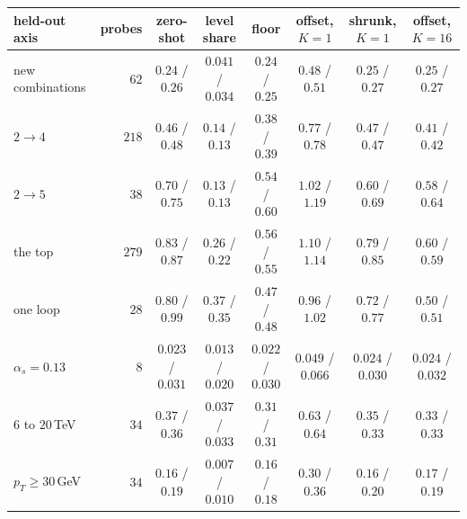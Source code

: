 \documentclass[11pt]{article}
\begin{document}
\begin{center}
\small
\begin{tabular}{lrcccccc}
\hline
held-out axis & probes & zero-shot & level share & floor & offset, $K=1$ & shrunk, $K=1$ & offset, $K=16$ \\
\hline
new combinations & $62$ & $0.24$ / $0.26$ & $0.041$ / $0.034$ & $0.24$ / $0.25$ & $0.48$ / $0.51$ & $0.25$ / $0.27$ & $0.25$ / $0.27$ \\
$2\to4$ & $218$ & $0.46$ / $0.48$ & $0.14$ / $0.13$ & $0.38$ / $0.39$ & $0.77$ / $0.78$ & $0.47$ / $0.47$ & $0.41$ / $0.42$ \\
$2\to5$ & $38$ & $0.70$ / $0.75$ & $0.13$ / $0.13$ & $0.54$ / $0.60$ & $1.02$ / $1.19$ & $0.60$ / $0.69$ & $0.58$ / $0.64$ \\
the top & $279$ & $0.83$ / $0.87$ & $0.26$ / $0.22$ & $0.56$ / $0.55$ & $1.10$ / $1.14$ & $0.79$ / $0.85$ & $0.60$ / $0.59$ \\
one loop & $28$ & $0.80$ / $0.99$ & $0.37$ / $0.35$ & $0.47$ / $0.48$ & $0.96$ / $1.02$ & $0.72$ / $0.77$ & $0.50$ / $0.51$ \\
$\alpha_s=0.13$ & $8$ & $0.023$ / $0.031$ & $0.013$ / $0.020$ & $0.022$ / $0.030$ & $0.049$ / $0.066$ & $0.024$ / $0.030$ & $0.024$ / $0.032$ \\
$6$ to $20$\,TeV & $34$ & $0.37$ / $0.36$ & $0.037$ / $0.033$ & $0.31$ / $0.31$ & $0.63$ / $0.64$ & $0.35$ / $0.33$ & $0.33$ / $0.33$ \\
$p_T\geq30$\,GeV & $34$ & $0.16$ / $0.19$ & $0.007$ / $0.010$ & $0.16$ / $0.18$ & $0.30$ / $0.36$ & $0.16$ / $0.20$ & $0.17$ / $0.19$ \\
\hline
\end{tabular}
\end{center}
\end{document}
